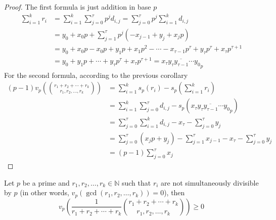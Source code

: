 \documentclass{treatise}
\begin{document}
\begin{proof}
The first formula is just addition in base $p$
\begin{align*}
\sum_{i = 1}^k r_i & = \sum_{i = 1}^k \sum_{j = 0}^\tau p^j d_{i, j} = \sum_{j = 0}^\tau p^j \sum_{i = 1}^k d_{i, j} \\
& = y_0 + x_0 p + \sum_{j = 1}^\tau p^j (-x_{j - 1} + y_j + x_j p) \\
& = y_0 + x_0 p - x_0 p + y_1 p + x_1 p^2 - \cdots - x_{\tau - 1} p^\tau + y_\tau p^\tau + x_\tau p^{\tau + 1} \\
& = y_0 + y_1 p + \cdots + y_\tau p^\tau + x_\tau p^{\tau + 1} = \overline{x_\tau y_\tau y_{\tau - 1} \cdots y_0}_p
\end{align*}
For the second formula, according to the previous corollary
\begin{align*}
(p - 1) v_p \left( {r_1 + r_2 + \cdots + r_k \choose r_1, r_2, \hdots, r_k} \right) & = \sum_{i = 1}^k s_p (r_i) - s_p \left( \sum_{i = 1}^k r_i \right) \\
& = \sum_{i = 1}^k \sum_{j = 0}^\tau d_{i, j} - s_p (\overline{x_\tau y_\tau y_{\tau - 1} \cdots y_0}_p) \\
& = \sum_{j = 0}^\tau \sum_{i = 1}^k d_{i, j} - x_\tau - \sum_{j = 0}^\tau y_j \\
& = \sum_{j = 0}^\tau (x_j p + y_j) - \sum_{j = 1}^\tau x_{j - 1} - x_\tau - \sum_{j = 0}^\tau y_j \\
& = (p - 1) \sum_{j = 0}^\tau x_j
\end{align*}
\end{proof}
\begin{lemma} \label{reduced-multi-pos-val}
Let $p$ be a prime and $r_1, r_2, \hdots, r_k \in \mathbb{N}$ such that $r_i$ are not simultaneously divisible by $p$ (in other words, $v_p (\gcd(r_1, r_2, \hdots, r_k)) = 0$), then
$$v_p \left( \frac{1}{r_1 + r_2 + \cdots + r_k} {r_1 + r_2 + \cdots + r_k \choose r_1, r_2, \hdots, r_k} \right) \geq 0$$
\end{lemma}
\end{document}
